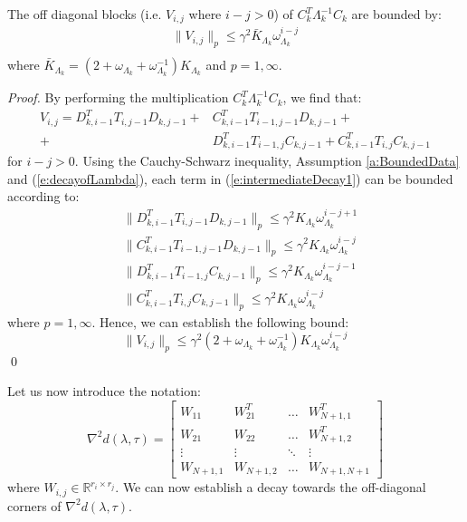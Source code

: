 \begin{proposition} \label{p:intermediateDecay}
The off diagonal blocks (i.e. $V_{i,j}$ where $i - j > 0$) of $C_k^T \Lambda_k^{-1} C_k$ are bounded by:
\begin{subequations}
\begin{align}
\| V_{i,j} \|_p \leq \gamma^2 \bar{K}_{\Lambda_k} \omega_{\Lambda_k}^{i-j} \\
\end{align}
\end{subequations}
where $\bar{K}_{\Lambda_k} = (2 + \omega_{\Lambda_k} + \omega_{\Lambda_k}^{-1}) K_{\Lambda_k}$ and $p=1,\infty$.
\end{proposition}
\begin{proof}
By performing the multiplication $C_k^T \Lambda_k^{-1} C_k$, we find that:
\begin{equation} \label{e:intermediateDecay1}
\begin{aligned}
V_{i,j} = D_{k,i-1}^T T_{i,j-1} D_{k,j-1} + & C_{k,i-1}^T T_{i-1,j-1} D_{k,j-1} + \\ + & D_{k,i-1}^T T_{i-1,j} C_{k,j-1} + C_{k,i-1}^T T_{i,j} C_{k,j-1}
\end{aligned}
\end{equation}
for $i - j > 0$. Using the Cauchy-Schwarz inequality, Assumption \ref{a:BoundedData} and (\ref{e:decayofLambda}), each term in (\ref{e:intermediateDecay1}) can be bounded according to:
\begin{subequations}
\begin{align}
& \| D_{k,i-1}^T T_{i,j-1} D_{k,j-1} \|_p \leq \gamma^2 K_{\Lambda_k} \omega_{\Lambda_k}^{i-j+1} \\
& \| C_{k,i-1}^T T_{i-1,j-1} D_{k,j-1} \|_p \leq \gamma^2 K_{\Lambda_k} \omega_{\Lambda_k}^{i-j} \\
& \| D_{k,i-1}^T T_{i-1,j} C_{k,j-1} \|_p \leq \gamma^2 K_{\Lambda_k} \omega_{\Lambda_k}^{i-j-1} \\
& \| C_{k,i-1}^T T_{i,j} C_{k,j-1} \|_p \leq \gamma^2 K_{\Lambda_k} \omega_{\Lambda_k}^{i-j}
\end{align}
\end{subequations}
where $p=1,\infty$. Hence, we can establish the following bound:
\begin{equation}
\| V_{i,j} \|_{p} \leq \gamma^2 (2 + \omega_{\Lambda_k} + \omega_{\Lambda_k}^{-1}) K_{\Lambda_k} \omega_{\Lambda_k}^{i-j}
\end{equation}
\qed
\end{proof}
Let us now introduce the notation:
\begin{equation} \label{e:HessianBlocks}
\nabla^2 d(\lambda, \tau) = \left[ \begin{array}{cccc}
W_{11} & W_{21}^T & \hdots & W_{N+1,1}^T \\
W_{21} & W_{22} & \hdots & W_{N+1,2}^T \\
\vdots & \vdots  & \ddots & \vdots \\
W_{N+1,1} & W_{N+1,2} & \hdots & W_{N+1,N+1}
\end{array} \right]
\end{equation}
where $W_{i,j} \in \mathbb{R}^{r_i \times r_j}$. We can now establish a decay towards the off-diagonal corners of $\nabla^2 d(\lambda, \tau)$.

